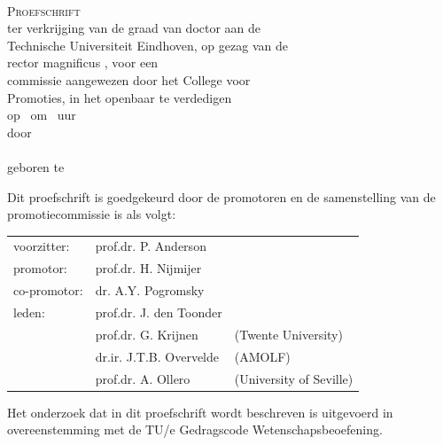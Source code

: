 \newpage
\thispagestyle{empty}



\vspace*{30mm}
\begin{center}
{\LARGE\sf\maintitle}\\[30mm] %
{\large\textsc{Proefschrift}}\\[8mm]
ter verkrijging van de graad van doctor aan de\\
Technische Universiteit Eindhoven, op gezag van de\\
rector magnificus \rector, voor een\\
commissie aangewezen door het College voor\\
Promoties, in het openbaar te verdedigen\\
op \ om \ uur\\[8mm]
door\\[8mm]
\@author\\[8mm]
geboren te \placeofbirth
\end{center}
\vfill

\newpage
\thispagestyle{empty}

\noindent
Dit proefschrift is goedgekeurd door de promotoren en de samenstelling van de promotiecommissie is als volgt:\\[7mm]

\noindent
\begin{tabular}{@{}l p{3.8cm} p{3.8cm}}
voorzitter:                 &   prof.dr. P. Anderson \\
promotor:                   &   prof.dr. H. Nijmijer \\
co-promotor:                &   dr. A.Y. Pogromsky \\
leden:                      &   prof.dr. J. den Toonder \\
                            &   prof.dr. G. Krijnen & (Twente University) \\
                            &   dr.ir. J.T.B. Overvelde &  (AMOLF) \\
                            &   prof.dr. A. Ollero  &  (University of Seville) \\
\end{tabular}

\vfill
\noindent
Het onderzoek dat in dit proefschrift wordt beschreven is uitgevoerd in overeenstemming met de TU/e Gedragscode Wetenschapsbeoefening.
